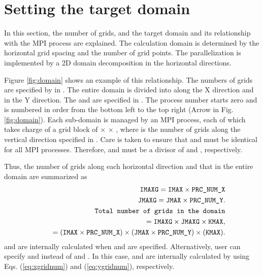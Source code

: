 \section{Setting the target domain} \label{sec:domain}

In this section, the number of grids, and the target domain and its relationship with the MPI process are explained.
The calculation domain is determined by the horizontal grid spacing and the number of grid points.
The parallelization is implemented by a 2D domain decomposition in the horizontal directions.

Figure \ref{fig:domain} shows an example of this relationship.
The numbers of grids are specified by  in .
The entire domain is divided into  along the X direction and  in the Y direction.
The  and  are specified in .
The process number starts zero and is numbered in order from the bottom left to the top right (Arrow in Fig. \ref{fig:domain}).
Each sub-domain is managed by an MPI process, each of which takes charge of a grid block of  $\times$  $\times$ ,
where  is the number of grids along the vertical direction specified in .
Care is taken to ensure that  and  must be identical for all MPI processes.
Therefore,  and  must be a divisor of  and , respectively.

Thus, the number of grids along each horizontal direction and that in the entire domain are summarized as
\begin{eqnarray}
  && \nmitemeq{IMAXG} = \nmitemeq{IMAX} \times \nmitemeq{PRC_NUM_X}
  \label{eq:xgridnum}\\
  && \nmitemeq{JMAXG} = \nmitemeq{JMAX} \times \nmitemeq{PRC_NUM_Y}.
  \label{eq:ygridnum}\\
&& \verb|Total number of grids in the domain| \nonumber\\
&&\quad = \nmitemeq{IMAXG} \times \nmitemeq{JMAXG} \times \nmitemeq{KMAX}, \nonumber\\
&&\quad = \left(\nmitemeq{IMAX} \times \nmitemeq{PRC_NUM_X}\right)
          \times (\nmitemeq{JMAX} \times \nmitemeq{PRC_NUM_Y})
          \times (\nmitemeq{KMAX} ).
\end{eqnarray}
 and  are internally calculated when  and  are specified.
Alternatively, user can specify  and  instead of  and .
In this case,  and  are internally calculated by using Eqs. (\ref{eq:xgridnum}) and (\ref{eq:ygridnum}), respectively.



